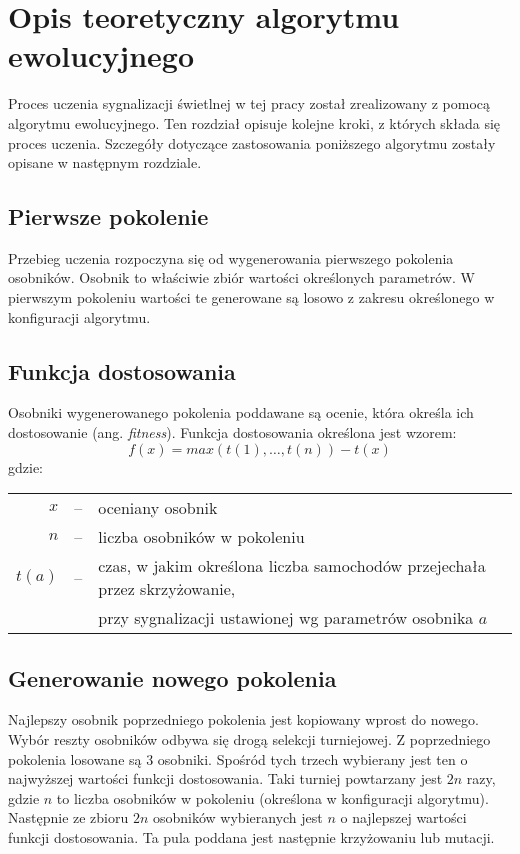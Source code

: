\chapter*{Opis teoretyczny algorytmu ewolucyjnego}
Proces uczenia sygnalizacji świetlnej w tej pracy został zrealizowany z pomocą algorytmu ewolucyjnego. Ten rozdział opisuje kolejne kroki, z których składa się proces uczenia. Szczegóły dotyczące zastosowania poniższego algorytmu zostały opisane w następnym rozdziale.
\section*{Pierwsze pokolenie}
Przebieg uczenia rozpoczyna się od wygenerowania pierwszego pokolenia osobników. Osobnik to właściwie zbiór wartości określonych parametrów. W pierwszym pokoleniu wartości te generowane są losowo z zakresu określonego w konfiguracji algorytmu. 
\section*{Funkcja dostosowania}
Osobniki wygenerowanego pokolenia poddawane są ocenie, która określa ich dostosowanie (ang. \textit{fitness}). Funkcja dostosowania określona jest wzorem:
\begin{equation}
f(x) = max(t(1),\ldots, t(n)) - t(x)
\label{fitness}
\end{equation} 
gdzie:\\
\begin{tabularx}{\textwidth}{ r c l }
$x$ & -- & oceniany osobnik\\
$n$ & -- & liczba osobników w pokoleniu\\
$t(a)$ & -- & czas, w jakim określona liczba samochodów przejechała przez skrzyżowanie,\\ &&przy sygnalizacji ustawionej wg parametrów osobnika $ a $
\end{tabularx}
\section*{Generowanie nowego pokolenia}
Najlepszy osobnik poprzedniego pokolenia jest kopiowany wprost do nowego. 
Wybór reszty osobników odbywa się drogą selekcji turniejowej. Z poprzedniego pokolenia losowane są 3 osobniki. Spośród tych trzech wybierany jest ten o najwyższej wartości funkcji dostosowania. Taki turniej powtarzany jest $2n$ razy, gdzie $n$ to liczba osobników w pokoleniu (określona w konfiguracji algorytmu). Następnie ze zbioru $2n$ osobników wybieranych jest $n$ o najlepszej wartości funkcji dostosowania. Ta pula poddana jest następnie krzyżowaniu lub mutacji.
